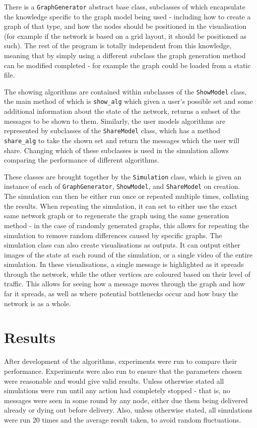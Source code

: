 \documentclass[bsc,frontabs,twoside,singlespacing,parskip,deptreport]{infthesis}     %
\begin{document}
There is a \texttt{GraphGenerator} abstract base class, subclasses of which encapsulate the knowledge specific to the graph model being used - including how to create a graph of that type, and how the nodes should be positioned in the visualisation (for example if the network is based on a grid layout, it should be positioned as such). The rest of the program is totally independent from this knowledge, meaning that by simply using a different subclass the graph generation method can be modified completed - for example the graph could be loaded from a static file.

The showing algorithms are contained within subclasses of the \texttt{ShowModel} class, the main method of which is \texttt{show\_alg} which given a user's possible set and some additional information about the state of the network, returns a subset of the messages to be shown to them. Similarly, the user models algorithms are represented by subclasses of the \texttt{ShareModel} class, which has a method \texttt{share\_alg} to take the shown set and return the messages which the user will share. Changing which of these subclasses is used in the simulation allows comparing the performance of different algorithms.

These classes are brought together by the \texttt{Simulation} class, which is given an instance of each of \texttt{GraphGenerator}, \texttt{ShowModel}, and \texttt{ShareModel} on creation. The simulation can then be either run once or repeated multiple times, collating the results. When repeating the simulation, it can set to either use the exact same network graph or to regenerate the graph using the same generation method - in the case of randomly generated graphs, this allows for repeating the simulation to remove random differences caused by specific graphs. The simulation class can also create visualisations as outputs. It can output either images of the state at each round of the simulation, or a single video of the entire simulation. In these visualisations, a single message is highlighted as it spreads through the network, while the other vertices are coloured based on their level of traffic. This allows for seeing how a message moves through the graph and how far it spreads, as well as where potential bottlenecks occur and how busy the network is as a whole.


\chapter{Results}
After development of the algorithms, experiments were run to compare their performance. Experiments were also run to ensure that the parameters chosen were reasonable and would give valid results. Unless otherwise stated all simulations were run until any action had completely stopped - that is, no messages were seen in some round by any node, either due them being delivered already or dying out before delivery. Also, unless otherwise stated, all simulations were run 20 times and the average result taken, to avoid random fluctuations.
\end{document}
